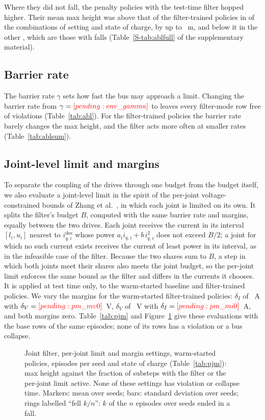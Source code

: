 Where they did not fall, the penalty policies with the test-time filter hopped higher. Their mean max height was above that of the filter-trained policies in  of the  combinations of setting and state of charge, by up to ~m, and below it in the other , which are those with falls (Table~\ref{S-tab:ablfull} of the supplementary material).

\subsection{Barrier rate}\label{sec:gamma}
The barrier rate $\gamma$ sets how fast the bus may approach a limit. Changing the barrier rate from $\gamma=\res{env_gamma}$ to  leaves every filter-mode row free of violations (Table~\ref{tab:abl}). For the filter-trained policies the barrier rate barely changes the max height, and the filter acts more often at smaller rates (Table~\ref{tab:ablsum}).

\subsection{Joint-level limit and margins}\label{sec:pjm}
To separate the coupling of the drives through one budget from the budget itself, we also evaluate a joint-level limit in the spirit of the per-joint voltage-constrained bounds of Zhang et al.\ \cite{zhang2026vra}, in which each joint is limited on its own. It splits the filter's budget $B$, computed with the same barrier rate and margins, equally between the two drives. Each joint receives the current in its interval $[l_i,u_i]$ nearest to $i^{\mathrm{des}}_{q,i}$ whose power $a_i i_{q,i}+b\,i_{q,i}^2$ does not exceed $B/2$; a joint for which no such current exists receives the current of least power in its interval, as in the infeasible case of the filter. Because the two shares sum to $B$, a step in which both joints meet their shares also meets the joint budget, so the per-joint limit enforces the same bound as the filter and differs in the currents it chooses. It is applied at test time only, to the warm-started baseline and filter-trained policies. We vary the margins for the warm-started filter-trained policies: $\delta_I$ of ~A with $\delta_V=\res{pm_mv0}$~V, $\delta_V$ of ~V with $\delta_I=\res{pm_mi0}$~A, and both margins zero. Table~\ref{tab:pjm} and Figure~\ref{fig:settings} give these evaluations with the base rows of the same episodes; none of its  rows has a violation or a bus collapse.
\begin{figure}[tbp]\centering{}\caption{Joint filter, per-joint limit and margin settings, warm-started policies,  episodes per seed and state of charge (Table~\ref{tab:pjm}): max height against the fraction of substeps with the filter or the per-joint limit active. None of these settings has violation or collapse time. Markers: mean over seeds; bars: standard deviation over seeds; rings labelled ``fell $k/n$'': $k$ of the $n$ episodes over seeds ended in a fall.}\label{fig:settings}\end{figure}

